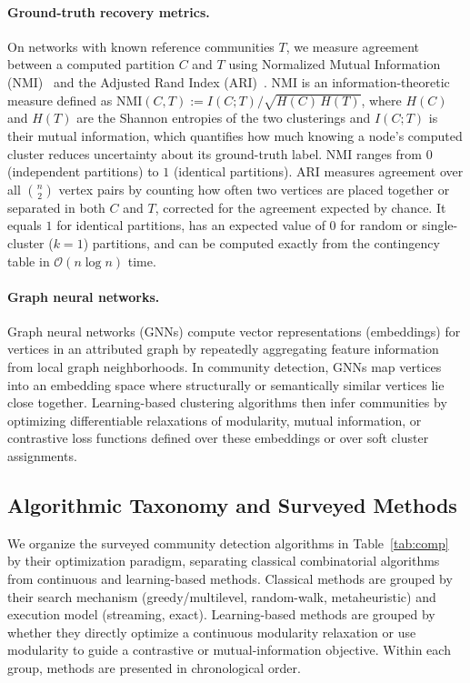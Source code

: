 \documentclass[11pt,a4paper]{article}
\begin{document}
\paragraph*{\textbf{Ground-truth recovery metrics.}}
On networks with known reference communities $T$, we measure agreement between a computed partition $C$ and $T$ using Normalized Mutual Information (NMI)~\cite{danon2005comparing} and the Adjusted Rand Index (ARI)~\cite{hubert1985}. NMI is an information-theoretic measure defined as $\text{NMI}(C, T) := I(C; T) / \sqrt{H(C)\,H(T)}$, where $H(C)$ and $H(T)$ are the Shannon entropies of the two clusterings and $I(C; T)$ is their mutual information, which quantifies how much knowing a node's computed cluster reduces uncertainty about its ground-truth label. NMI ranges from $0$ (independent partitions) to $1$ (identical partitions). ARI measures agreement over all $\binom{n}{2}$ vertex pairs by counting how often two vertices are placed together or separated in both $C$ and $T$, corrected for the agreement expected by chance. It equals $1$ for identical partitions, has an expected value of $0$ for random or single-cluster ($k=1$) partitions, and can be computed exactly from the contingency table in $\mathcal{O}(n \log n)$ time.

\paragraph*{\textbf{Graph neural networks.}}
Graph neural networks (GNNs) compute vector representations (embeddings) for vertices in an attributed graph by repeatedly aggregating feature information from local graph neighborhoods. In community detection, GNNs map vertices into an embedding space where structurally or semantically similar vertices lie close together. Learning-based clustering algorithms then infer communities by optimizing differentiable relaxations of modularity, mutual information, or contrastive loss functions defined over these embeddings or over soft cluster assignments.

\subsection{Algorithmic Taxonomy and Surveyed Methods}
We organize the surveyed community detection algorithms in Table~\ref{tab:comp} by their optimization paradigm, separating classical combinatorial algorithms from continuous and learning-based methods. Classical methods are grouped by their search mechanism (greedy/multilevel, random-walk, metaheuristic) and execution model (streaming, exact). Learning-based methods are grouped by whether they directly optimize a continuous modularity relaxation or use modularity to guide a contrastive or mutual-information objective. Within each group, methods are presented in chronological order.
\end{document}
